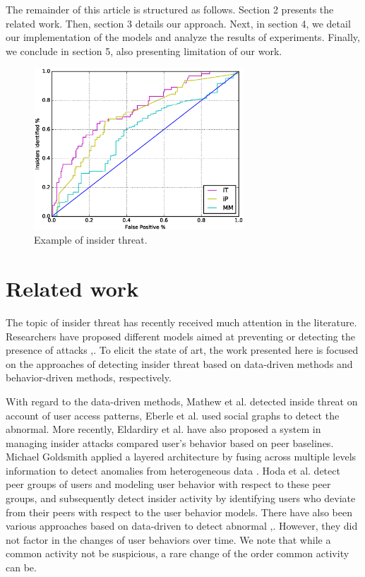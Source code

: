 \documentclass[conference]{IEEEtran}
\begin{document}
The remainder of this article is structured as follows. 
Section 2 presents the related work.
Then, section 3 details our approach. Next, in section 4, 
we detail our implementation of the models and analyze the results of experiments. 
Finally, we conclude in section 5, also presenting limitation of our work.

\begin{figure}[htb]
\centerline{\includegraphics[width = 0.7\textwidth]{figure/figure1.eps}}
\caption{Example of insider threat.}
\label{fig}
\end{figure}


\section{Related work}
The topic of insider threat has recently received much attention in the literature. Researchers have proposed different models aimed at preventing or detecting the presence of attacks  \cite{b11},\cite{b12}. To elicit the state of art, the work
presented here is focused on the approaches of detecting insider threat based on data-driven methods and behavior-driven methods, respectively.

With regard to the data-driven methods, Mathew et al. \cite{b13} detected inside threat on account of user access patterns, Eberle et al. \cite{b14} used social graphs to detect the abnormal. More recently, Eldardiry et al. \cite{b15} have also proposed a system in managing insider attacks compared user’s behavior based on peer baselines.
Michael Goldsmith applied a layered architecture by fusing across multiple levels information to detect anomalies from heterogeneous data \cite{b16}. Hoda et al. \cite{b13} detect peer groups of users and modeling user behavior with respect to these peer groups, and subsequently detect insider activity by identifying users who deviate from their peers with respect to the user behavior models. 
There have also been various approaches based on data-driven to detect abnormal \cite{b10},\cite{b8}. 
However, they did not factor in the changes of user behaviors over time. We note that while a common activity not be suspicious, a rare change of the order common activity can be. 
\end{document}
